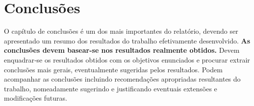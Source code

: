 \chapter{Conclus\~oes} %
\label{chap:conclusoes}

O capítulo de conclusões é um dos mais importantes do relatório, devendo ser apresentado um resumo dos resultados do trabalho efetivamente desenvolvido. \textbf{As conclusões devem basear-se nos resultados realmente obtidos.} Devem enquadrar‑se os resultados obtidos com os objetivos enunciados e procurar extrair conclusões mais gerais, eventualmente sugeridas pelos resultados. Podem acompanhar as conclusões incluindo recomendações apropriadas resultantes do trabalho, nomeadamente sugerindo e justificando eventuais extensões e modificações futuras.






